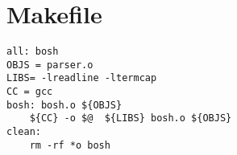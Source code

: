 \chapter{Makefile}
\begin{lstlisting}
all: bosh
OBJS = parser.o
LIBS= -lreadline -ltermcap
CC = gcc
bosh: bosh.o ${OBJS}
	${CC} -o $@  ${LIBS} bosh.o ${OBJS}
clean:
	rm -rf *o bosh
\end{lstlisting}
